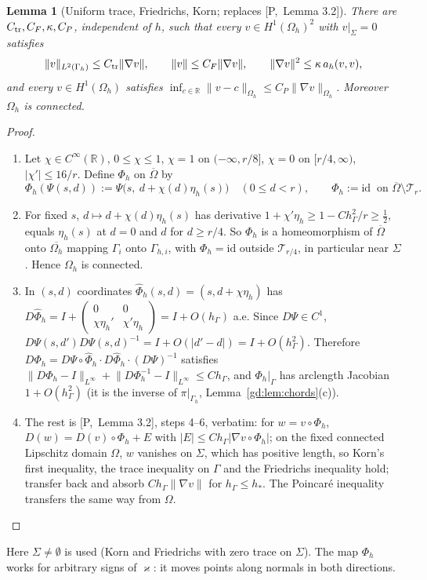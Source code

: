 \documentclass[11pt,reqno]{amsart}
\theoremstyle{plain}
\newtheorem{lemma}[theorem]{Lemma}
\theoremstyle{definition}
\newcommand{\R}{\mathbb R}
\newcommand{\hG}{h_\Gamma}
\newcommand{\Gh}{\Gamma_h}
\newcommand{\Oh}{\Omega_h}
\newcommand{\norm}[1]{\lVert #1\rVert}
\newcommand{\kap}{\varkappa}            %
\newcommand{\Pref}[1]{\textup{[P,~#1]}}
\begin{document}
\begin{lemma}[Uniform trace, Friedrichs, Korn; replaces \Pref{Lemma 3.2}]\label{gd:lem:korn}
There are $C_{\rm tr},C_F,\kappa,C_P$, independent of $h$, such that every $v\in H^1(\Oh)^2$ with $v|_\Sigma=0$ satisfies
\[
\norm{v}_{L^2(\Gh)}\le C_{\rm tr}\norm{\nabla v},\qquad\norm{v}\le C_F\norm{\nabla v},\qquad\norm{\nabla v}^2\le\kappa\,a_h(v,v),
\]
and every $v\in H^1(\Oh)$ satisfies $\inf_{c\in\R}\norm{v-c}_{\Oh}\le C_P\norm{\nabla v}_{\Oh}$. Moreover $\Oh$ is connected.
\end{lemma}

\begin{proof}
\begin{enumerate}
\item Let $\chi\in C^\infty(\R)$, $0\le\chi\le1$, $\chi=1$ on $(-\infty,r/8]$, $\chi=0$ on $[r/4,\infty)$, $|\chi'|\le16/r$. Define $\Phi_h$ on $\overline\Omega$ by
\[
\Phi_h(\Psi(s,d)):=\Psi\bigl(s,\ d+\chi(d)\eta_h(s)\bigr)\quad(0\le d<r),\qquad\Phi_h:=\mathrm{id}\ \text{ on }\overline\Omega\setminus\mathcal T_r .
\]
\item For fixed $s$, $d\mapsto d+\chi(d)\eta_h(s)$ has derivative $1+\chi'\eta_h\ge1-C\hG^2/r\ge\frac12$, equals $\eta_h(s)$ at $d=0$ and $d$ for $d\ge r/4$. So $\Phi_h$ is a homeomorphism of $\overline\Omega$ onto $\overline{\Oh}$ mapping $\Gamma_i$ onto $\Gamma_{h,i}$, with $\Phi_h=\mathrm{id}$ outside $\mathcal T_{r/4}$, in particular near $\Sigma$. Hence $\Oh$ is connected.
\item In $(s,d)$ coordinates $\hat\Phi_h(s,d)=(s,d+\chi\eta_h)$ has $D\hat\Phi_h=I+\begin{pmatrix}0&0\\\chi\eta_h'&\chi'\eta_h\end{pmatrix}=I+O(\hG)$ a.e. Since $D\Psi\in C^1$, $D\Psi(s,d')D\Psi(s,d)^{-1}=I+O(|d'-d|)=I+O(\hG^2)$. Therefore $D\Phi_h=D\Psi\circ\hat\Phi_h\cdot D\hat\Phi_h\cdot(D\Psi)^{-1}$ satisfies $\norm{D\Phi_h-I}_{L^\infty}+\norm{D\Phi_h^{-1}-I}_{L^\infty}\le C\hG$, and $\Phi_h|_\Gamma$ has arclength Jacobian $1+O(\hG^2)$ (it is the inverse of $\pi|_{\Gh}$, Lemma~\ref{gd:lem:chords}(c)).
\item The rest is \Pref{Lemma 3.2}, steps 4--6, verbatim: for $w=v\circ\Phi_h$, $D(w)=D(v)\circ\Phi_h+E$ with $|E|\le C\hG|\nabla v\circ\Phi_h|$; on the fixed connected Lipschitz domain $\Omega$, $w$ vanishes on $\Sigma$, which has positive length, so Korn's first inequality, the trace inequality on $\Gamma$ and the Friedrichs inequality hold; transfer back and absorb $C\hG\norm{\nabla v}$ for $\hG\le h_\ast$. The Poincar\'e inequality transfers the same way from $\Omega$.\qedhere
\end{enumerate}
\end{proof}
Here $\Sigma\ne\emptyset$ is used (Korn and Friedrichs with zero trace on $\Sigma$). The map $\Phi_h$ works for arbitrary signs of $\kap$: it moves points along normals in both directions.
\end{document}
